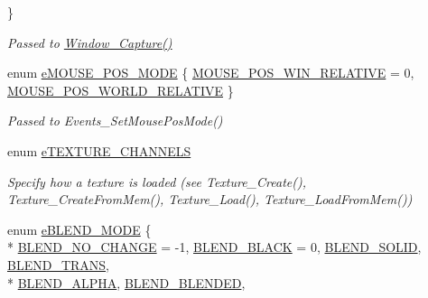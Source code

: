 \begin{DoxyCompactItemize}
 \}
\begin{DoxyCompactList}\small\item\em Passed to \hyperlink{group____window_ga6f1988a980a344472bcc3a0b3b24ed84}{Window\-\_\-\-Capture()} \end{DoxyCompactList}\item 
enum \hyperlink{group____enums_ga0aeff75213c3ae4bb8edd1f8a49a5225}{e\-M\-O\-U\-S\-E\-\_\-\-P\-O\-S\-\_\-\-M\-O\-D\-E} \{ \hyperlink{group____enums_ga0aeff75213c3ae4bb8edd1f8a49a5225a9831126b87f6a31a6b1d863a054d3fb8}{M\-O\-U\-S\-E\-\_\-\-P\-O\-S\-\_\-\-W\-I\-N\-\_\-\-R\-E\-L\-A\-T\-I\-V\-E} = 0, 
\hyperlink{group____enums_ga0aeff75213c3ae4bb8edd1f8a49a5225a46449105ef1d03a91c18b273da9d5287}{M\-O\-U\-S\-E\-\_\-\-P\-O\-S\-\_\-\-W\-O\-R\-L\-D\-\_\-\-R\-E\-L\-A\-T\-I\-V\-E}
 \}
\begin{DoxyCompactList}\small\item\em Passed to Events\-\_\-\-Set\-Mouse\-Pos\-Mode() \end{DoxyCompactList}\item 
enum \hyperlink{group____enums_ga3ac9fb8a5736de19d887b8eca2a34889}{e\-T\-E\-X\-T\-U\-R\-E\-\_\-\-C\-H\-A\-N\-N\-E\-L\-S} 
\begin{DoxyCompactList}\small\item\em Specify how a texture is loaded (see Texture\-\_\-\-Create(), Texture\-\_\-\-Create\-From\-Mem(), Texture\-\_\-\-Load(), Texture\-\_\-\-Load\-From\-Mem()) \end{DoxyCompactList}\item 
enum \hyperlink{group____enums_ga332b9dbc3141f0555a6deea6cffed74a}{e\-B\-L\-E\-N\-D\-\_\-\-M\-O\-D\-E} \{ \\*
\hyperlink{group____enums_ga332b9dbc3141f0555a6deea6cffed74aa94ec97b8ff2a52ec886831abc06cc3b1}{B\-L\-E\-N\-D\-\_\-\-N\-O\-\_\-\-C\-H\-A\-N\-G\-E} = -\/1, 
\hyperlink{group____enums_ga332b9dbc3141f0555a6deea6cffed74aaa3aca837c1cda3dcb9aee1b16a1baedf}{B\-L\-E\-N\-D\-\_\-\-B\-L\-A\-C\-K} = 0, 
\hyperlink{group____enums_ga332b9dbc3141f0555a6deea6cffed74aa17af4dcc0709c1a6f05b17ec6f89b546}{B\-L\-E\-N\-D\-\_\-\-S\-O\-L\-I\-D}, 
\hyperlink{group____enums_ga332b9dbc3141f0555a6deea6cffed74aaad131199224881c4f40f0dc125160569}{B\-L\-E\-N\-D\-\_\-\-T\-R\-A\-N\-S}, 
\\*
\hyperlink{group____enums_ga332b9dbc3141f0555a6deea6cffed74aac22cd29896978661961661ae66e10aaf}{B\-L\-E\-N\-D\-\_\-\-A\-L\-P\-H\-A}, 
\hyperlink{group____enums_ga332b9dbc3141f0555a6deea6cffed74aabb83c4312662d356cefa95cbc82c498a}{B\-L\-E\-N\-D\-\_\-\-B\-L\-E\-N\-D\-E\-D}, 

\end{DoxyCompactItemize}
